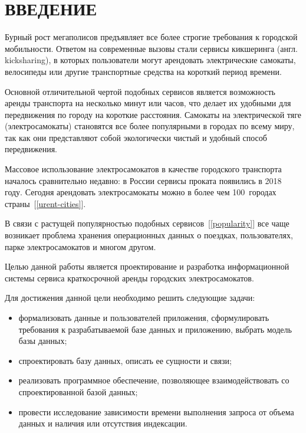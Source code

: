 \chapter*{ВВЕДЕНИЕ}

Бурный рост мегаполисов предъявляет все более строгие требования к городской мобильности. Ответом на современные вызовы стали сервисы кикшеринга (англ. kicksharing), в которых пользователи могут арендовать электрические самокаты, велосипеды или другие транспортные средства на короткий период времени.

Основной отличительной чертой подобных сервисов является возможность аренды транспорта на несколько минут или часов, что делает их удобными для передвижения по городу на короткие расстояния. Самокаты на электрической тяге (электросамокаты) становятся все более популярными в городах по всему миру, так как они представляют собой экологически чистый и удобный способ передвижения.

Массовое использование электросамокатов в качестве городского транспорта началось сравнительно недавно: в России сервисы проката появились в 2018 году. Сегодня арендовать электросамокаты можно в более чем 100~городах страны~[\ref{urent-cities}].

В связи с растущей популярностью подобных сервисов~[\ref{popularity}] все чаще возникает проблема хранения операционных данных о поездках, пользователях, парке электросамокатов и многом другом.

Целью данной работы является проектирование и разработка информационной системы сервиса краткосрочной аренды городских электросамокатов.

Для достижения данной цели необходимо решить следующие задачи:

\begin{itemize}
	\item формализовать данные и пользователей приложения, сформулировать требования к разрабатываемой базе данных и приложению, выбрать модель базы данных;
	\item спроектировать базу данных, описать ее сущности и связи;
	\item реализовать программное обеспечение, позволяющее взаимодействовать со спроектированной базой данных;
	\item провести исследование зависимости времени выполнения запроса от объема данных и наличия или отсутствия индексации.
\end{itemize}